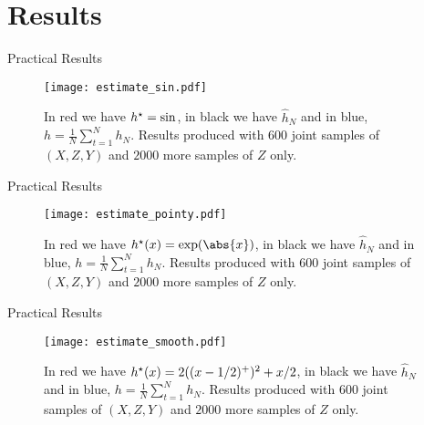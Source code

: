 \documentclass[aspectratio=169]{beamer}
\begin{document}
    \section{Results}

    \begin{frame}{Practical Results}
        \begin{figure}[htb]
            \begin{center}
                \texttt{[image: estimate\_sin.pdf]}
                \caption{In red we have $ h^{ \star } = \sin $, in black we have $ \hat{ h }_{ N } $ and in blue, $ h = \frac{ 1 }{ N } \sum_{ t=1 }^{ N } h_{ N } $.
                Results produced with $ 600 $ joint samples of $ ( X, Z, Y ) $ and $ 2000 $ more samples of $ Z $ only.}
            \end{center}
        \end{figure}
    \end{frame}

    \begin{frame}{Practical Results}
        \begin{figure}[htb]
            \begin{center}
                \texttt{[image: estimate\_pointy.pdf]}
                \caption{In red we have $ \hstar ( x ) = \exp ( \abs{ x } ) $, in black we have $ \hat{ h }_{ N } $ and in blue, $ h = \frac{ 1 }{ N } \sum_{ t=1 }^{ N } h_{ N } $.
                Results produced with $ 600 $ joint samples of $ ( X, Z, Y ) $ and $ 2000 $ more samples of $ Z $ only.}
            \end{center}
        \end{figure}
    \end{frame}


    \begin{frame}{Practical Results}
        \begin{figure}[htb]
            \begin{center}
                \texttt{[image: estimate\_smooth.pdf]}
                \caption{In red we have $ h^{ \star } ( x ) = 2 ( ( x - 1/2 )^{ + } )^2 + x/2 $, in black we have $ \hat{ h }_{ N } $ and in blue, $ h = \frac{ 1 }{ N } \sum_{ t=1 }^{ N } h_{ N } $.
                Results produced with $ 600 $ joint samples of $ ( X, Z, Y ) $ and $ 2000 $ more samples of $ Z $ only.}
            \end{center}
        \end{figure}
    \end{frame}
\end{document}
